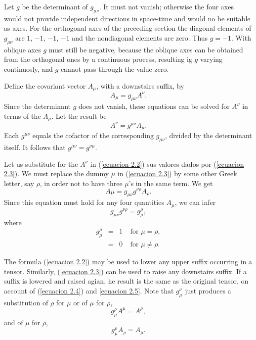 Let $g$ be the determinant of $g_{\mu\nu}$. It must not vanish; otherwise the four axes would not provide independent directions in space-time and would no be suitable as axes. For the orthogonal axes of the preceding section the diagonal elements of $g_{\mu\nu}$ are $1$, $-1$, $-1$, $-1$ and the nondiagonal elements are zero. Thus $g=-1$. With oblique axes $g$ must still be negative, because the oblique axes can be obtained from the orthogonal ones by a continuous process, resulting ig $g$ varying continuosly, and $g$ cannot pass through the value zero.

Define the covariant vector $A_\mu$, with a downstairs suffix, by
\begin{equation}
 \label{ecuacion 2.2}
 A_\mu = g_{\mu\nu} A^\nu.
\end{equation}
Since the determinant $g$ does not vanish, these equations can be solved for $A^\nu$ in terms of the $A_\mu$. Let the result be
\begin{equation}
 \label{ecuacion 2.3}
 A^\nu = g^{\mu\nu} A_\mu.
\end{equation}
Each $g^{\mu\nu}$ equals the cofactor of the corresponding $g_{\mu\nu}$, divided by the determinant itself. It follows that $g^{\mu\nu} = g^{\nu\mu}$.

Let us substitute for the $A^\nu$ in (\ref{ecuacion 2.2}) sus valores dados por (\ref{ecuacion 2.3}). We must replace the dummy $\mu$ in (\ref{ecuacion 2.3}) by some other Greek letter, say $\rho$, in order not to have three $\mu$'s in the same term. We get
\[
 A\mu = g_{\mu\nu} g^{\nu\rho}A_\rho.
\]
Since this equation must hold for any four quantities $A_\mu$, we can infer 
\begin{equation}
 \label{ecuacion 2.4}
 g_{\mu\nu} g^{\nu\rho} = g_{\mu}^{\rho},
\end{equation}
where
\begin{equation}
 \label{ecuacion 2.5}
 \begin{array}{rclr}
    g_{\mu}^{\rho} & = & 1 & \mbox{ for } \mu = \rho,\\
                   & = & 0 & \mbox{ for } \mu \ne \rho.
 \end{array}
\end{equation}

The formula (\ref{ecuacion 2.2}) may be used to lower any upper suffix occurring in a tensor. Similarly, (\ref{ecuacion 2.3}) can be used to raise any downstairs suffix. If a suffix is lowered and raised agian, he result is the same as the original tensor, on account of (\ref{ecuacion 2.4}) and \ref{ecuacion 2.5}. Note that $g_{\mu}^{\nu}$ just produces a substitution of $\rho$ for $\mu$ or of $\mu$ for $\rho$,
\[
 g_{\mu}^{\rho} A^{\mu} = A^{\rho},
\]
and of $\mu$ for $\rho$,
\[
 g_{\mu}^{\rho} A_{\rho} = A_{\mu}.
\]

